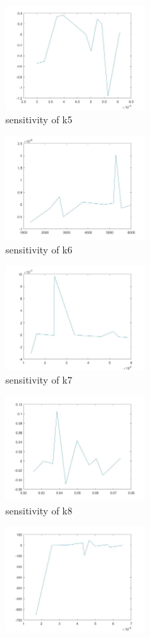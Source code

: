 \begin{figure}[H]
\begin{subfigure}{0.5\textwidth}
		\includegraphics[height=4cm]{s5.jpg}
		\caption{sensitivity of k5}
	\end{subfigure}%
	\begin{subfigure}{0.5\textwidth}
		\includegraphics[height=4cm]{s6.jpg}
		\caption{sensitivity of k6}
	\end{subfigure}
	\begin{subfigure}{0.5\textwidth}
		\includegraphics[height=4cm]{s7.jpg}
		\caption{sensitivity of k7}
	\end{subfigure}%
	\begin{subfigure}{0.5\textwidth}
		\includegraphics[height=4cm]{s8.jpg}
		\caption{sensitivity of k8}
	\end{subfigure}
	\begin{subfigure}{0.5\textwidth}
		\includegraphics[height=4cm]{s9.jpg}

\end{subfigure}
\end{figure}
